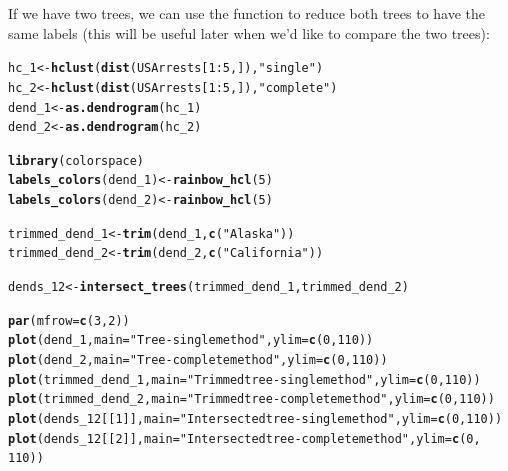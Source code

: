 \documentclass[shortnames,nojss,article]{jss}\usepackage{graphicx, color}
\makeatletter
\newcommand{\hlfunctioncall}[1]{\textcolor[rgb]{0.501960784313725,0,0.329411764705882}{\textbf{#1}}}%
\newcommand{\hlstring}[1]{\textcolor[rgb]{0.6,0.6,1}{#1}}%
\newenvironment{kframe}{%
 \def\at@end@of@kframe{}%
 \ifinner\ifhmode%
  \def\at@end@of@kframe{\end{minipage}}%
  \begin{minipage}{\columnwidth}%
 \fi\fi%
 \def\FrameCommand##1{\hskip\@totalleftmargin \hskip-\fboxsep
 \colorbox{shadecolor}{##1}\hskip-\fboxsep
     \hskip-\linewidth \hskip-\@totalleftmargin \hskip\columnwidth}%
 \MakeFramed {\advance\hsize-\width
   \@totalleftmargin\z@ \linewidth\hsize
   \@setminipage}}%
 {\par\unskip\endMakeFramed%
 \at@end@of@kframe}
\newenvironment{knitrout}{}{} %
\makeatother
\begin{document}
\begin{knitrout}
{}



\end{knitrout}


If we have two trees, we can use the  function to reduce both trees to have the same labels (this will be useful later when we'd like to compare the two trees):


\begin{knitrout}
\color{fgcolor}\begin{kframe}
\begin{alltt}

hc_1 <- \hlfunctioncall{hclust}(\hlfunctioncall{dist}(USArrests[1:5, ]), \hlstring{"single"})
hc_2 <- \hlfunctioncall{hclust}(\hlfunctioncall{dist}(USArrests[1:5, ]), \hlstring{"complete"})
dend_1 <- \hlfunctioncall{as.dendrogram}(hc_1)
dend_2 <- \hlfunctioncall{as.dendrogram}(hc_2)

\hlfunctioncall{library}(colorspace)
\hlfunctioncall{labels_colors}(dend_1) <- \hlfunctioncall{rainbow_hcl}(5)
\hlfunctioncall{labels_colors}(dend_2) <- \hlfunctioncall{rainbow_hcl}(5)


trimmed_dend_1 <- \hlfunctioncall{trim}(dend_1, \hlfunctioncall{c}(\hlstring{"Alaska"}))
trimmed_dend_2 <- \hlfunctioncall{trim}(dend_2, \hlfunctioncall{c}(\hlstring{"California"}))

dends_12 <- \hlfunctioncall{intersect_trees}(trimmed_dend_1, trimmed_dend_2)

\hlfunctioncall{par}(mfrow = \hlfunctioncall{c}(3, 2))
\hlfunctioncall{plot}(dend_1, main = \hlstring{"Tree - single method"}, ylim = \hlfunctioncall{c}(0, 110))
\hlfunctioncall{plot}(dend_2, main = \hlstring{"Tree - complete method"}, ylim = \hlfunctioncall{c}(0, 110))
\hlfunctioncall{plot}(trimmed_dend_1, main = \hlstring{"Trimmed tree - single method"}, ylim = \hlfunctioncall{c}(0, 110))
\hlfunctioncall{plot}(trimmed_dend_2, main = \hlstring{"Trimmed tree - complete method"}, ylim = \hlfunctioncall{c}(0, 110))
\hlfunctioncall{plot}(dends_12[[1]], main = \hlstring{"Intersected tree - single method"}, ylim = \hlfunctioncall{c}(0, 110))
\hlfunctioncall{plot}(dends_12[[2]], main = \hlstring{"Intersected tree - complete method"}, ylim = \hlfunctioncall{c}(0, 
    110))
\end{alltt}
\end{kframe}


\end{knitrout}
\end{document}
